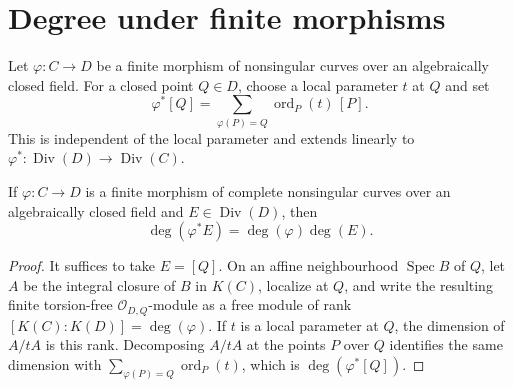 \section{Degree under finite morphisms}

\begin{definition}
  \label{def:finite_curve_divisor_pullback}

  Let \(\varphi\colon C\to D\) be a finite morphism of nonsingular curves
  over an algebraically closed field.
  For a closed point \(Q\in D\), choose a local parameter \(t\) at \(Q\) and
  set
  \[
    \varphi^*[Q]
      =\sum_{\varphi(P)=Q}\operatorname{ord}_P(t)\,[P].
  \]
  This is independent of the local parameter and extends linearly to
  \(\varphi^*\colon\operatorname{Div}(D)\to\operatorname{Div}(C)\).
\end{definition}

\begin{theorem}
  \label{thm:finite_curve_degree_pullback}

  If \(\varphi\colon C\to D\) is a finite morphism of complete nonsingular
  curves over an algebraically closed field and
  \(E\in\operatorname{Div}(D)\), then
  \[
    \deg(\varphi^*E)=\deg(\varphi)\deg(E).
  \]
\end{theorem}
\begin{proof}
  It suffices to take \(E=[Q]\).  On an affine neighbourhood
  \(\operatorname{Spec}B\) of \(Q\), let \(A\) be the integral closure of
  \(B\) in \(K(C)\), localize at \(Q\), and write the resulting finite
  torsion-free \(\mathcal O_{D,Q}\)-module as a free module of rank
  \([K(C):K(D)]=\deg(\varphi)\).  If \(t\) is a local parameter at \(Q\),
  the dimension of \(A/tA\) is this rank.  Decomposing \(A/tA\) at the
  points \(P\) over \(Q\) identifies the same dimension with
  \(\sum_{\varphi(P)=Q}\operatorname{ord}_P(t)\), which is
  \(\deg(\varphi^*[Q])\).
\end{proof}


